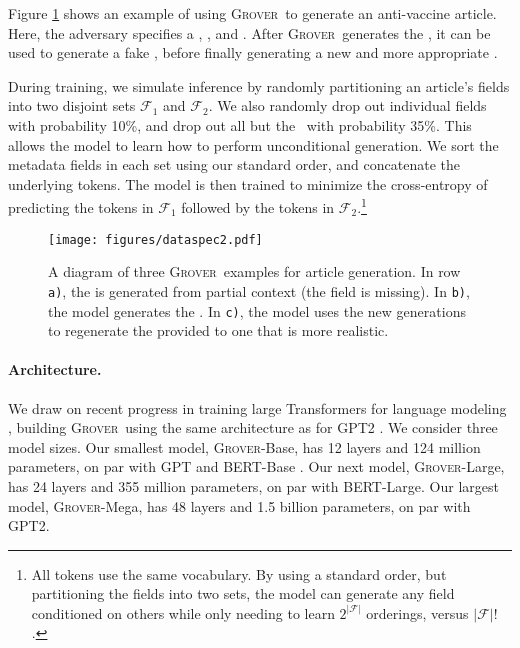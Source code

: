 \documentclass{article}
\newcommand{\modelname}{{\textsc{Grover}}}
\begin{document}
Figure \ref{fig:setup} shows an example of using \modelname~to generate an anti-vaccine article. Here, the adversary specifies a \domainfield, \datefield, and \headlinefield. After \modelname~generates the \bodyfield, it can be used to generate a fake \authorfield, before finally generating a new and more appropriate \headlinefield.

During training, we simulate inference by randomly partitioning an article's fields into two disjoint sets $\mathcal{F}_1$ and $\mathcal{F}_2$. We also randomly drop out individual fields with probability 10\%, and drop out all but the \bodyfield~with probability 35\%. This allows the model to learn how to perform unconditional generation. We sort the metadata fields in each set using our standard order, and concatenate the underlying tokens. The model is then trained to minimize the cross-entropy of predicting the tokens in $\mathcal{F}_1$ followed by the tokens in $\mathcal{F}_2$.\footnote{All tokens use the same vocabulary. By using a standard order, but partitioning the fields into two sets, the model can generate any field conditioned on others while only needing to learn $2^{|\mathcal{F}|}$ orderings, versus $|\mathcal{F}|!$.}

\begin{figure}[t!]
  \centering\small
    \texttt{[image: figures/dataspec2.pdf]}
    \vspace{-4mm}
\caption{A diagram of three \modelname~examples for article generation. In row {\tt\small a)}, the  is generated from partial context (the  field is missing). In {\tt\small b)}, the model generates the . In {\tt\small c)}, the model uses the new generations to regenerate the provided  to one that is more realistic.}\vspace{-3mm}
  \label{fig:setup}
\end{figure}

\paragraph{Architecture.}
We draw on recent progress in training large Transformers for language modeling \citep{vaswani2017attention}, building \modelname~using the same architecture as for GPT2 \citep{radford2019gpttwo}. We consider three model sizes. Our smallest model, \modelname-Base, has 12 layers and 124 million parameters, on par with GPT and BERT-Base \citep{radford2018improving,devlin2018bert}. Our next model, \modelname-Large, has 24 layers and 355 million parameters, on par with BERT-Large. Our largest model, \modelname-Mega, has 48 layers and 1.5 billion parameters, on par with GPT2.
\end{document}
